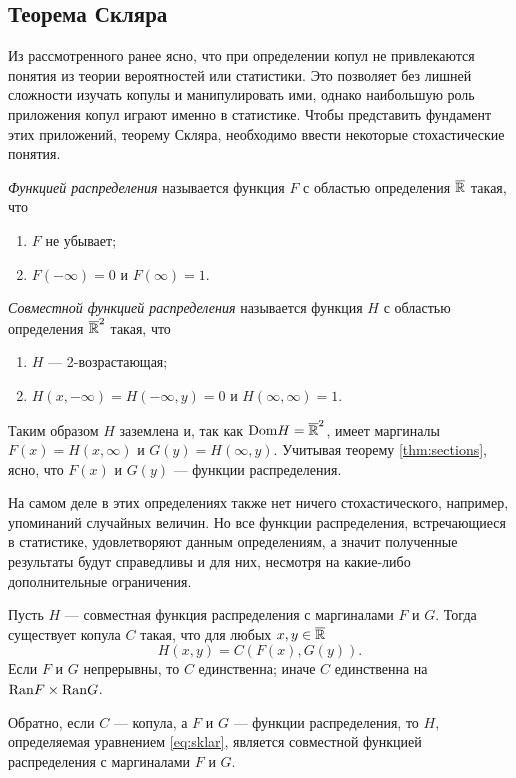 \subsection*{Теорема Скляра}

Из рассмотренного ранее ясно, что при определении копул не привлекаются понятия из теории вероятностей или статистики. Это позволяет без лишней сложности изучать копулы и манипулировать ими, однако наибольшую роль приложения копул играют именно в статистике. Чтобы представить фундамент этих приложений, теорему Скляра, необходимо ввести некоторые стохастические понятия.

\begin{define}
	\emph{Функцией распределения} называется функция $F$ с областью определения $\overline{\mathbb{R}}$ такая, что
	\begin{enumerate}
	\item $F$ не убывает;
	\item $F(-\infty) = 0$ и $F(\infty) = 1$.
	\end{enumerate}
\end{define}

\begin{define}
	\emph{Совместной функцией распределения} называется функция $H$ с областью определения $\overline{\mathbb{R}}^2$ такая, что
	\begin{enumerate}
	\item $H$ --- 2-возрастающая;
	\item $H(x, -\infty) = H(-\infty, y) = 0$ и $H(\infty, \infty) = 1$.
	\end{enumerate}
\end{define}

Таким образом $H$ заземлена и, так как $\mathrm{Dom}{H} = \overline{\mathbb{R}}^2$, имеет маргиналы $F(x) = H(x, \infty)$ и $G(y) = H(\infty, y)$. Учитывая теорему \ref{thm:sections}, ясно, что $F(x)$ и $G(y)$ --- функции распределения.

На самом деле в этих определениях также нет ничего стохастического, например, упоминаний случайных величин. Но все функции распределения, встречающиеся в статистике, удовлетворяют данным определениям, а значит полученные результаты будут справедливы и для них, несмотря на какие-либо дополнительные ограничения.

\begin{theorem}\label{thm:sklar}
	Пусть $H$ --- совместная функция распределения с маргиналами $F$ и $G$. Тогда существует копула $C$ такая, что для любых $x, y \in \overline{\mathbb{R}}$
\begin{equation}\label{eq:sklar}
	H(x, y) = C(F(x), G(y)).
\end{equation}
Если $F$ и $G$ непрерывны, то $C$ единственна; иначе $C$ единственна на $\mathrm{Ran}{F} \times \mathrm{Ran}{G}$.

Обратно, если $C$ --- копула, а $F$ и $G$ --- функции распределения, то $H$, определяемая уравнением \eqref{eq:sklar}, является совместной функцией распределения с маргиналами $F$ и $G$.
\end{theorem}

